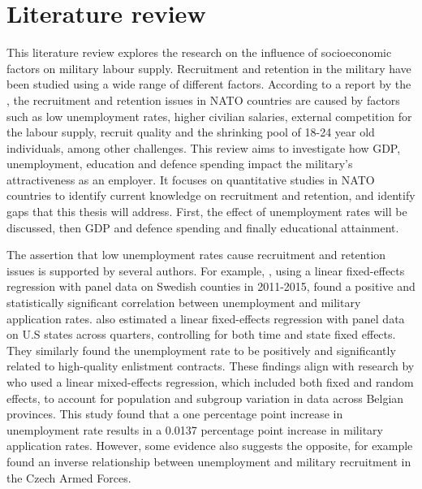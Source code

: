 \chapter{Literature review}

This literature review explores the research on the influence of socioeconomic factors on military labour supply. 
Recruitment and retention in the military have been studied using a wide range of different factors. 
According to a report by the \textcite{nato_research_and_technology_organization_recruiting_2007}, the recruitment and retention issues in NATO countries are caused by factors such as low unemployment rates, higher civilian salaries, external competition for the labour supply, recruit quality and the shrinking pool of 18-24 year old individuals, among other challenges. 
This review aims to investigate how GDP, unemployment, education and defence spending impact the military's attractiveness as an employer. 
It focuses on quantitative studies in NATO countries to identify current knowledge on recruitment and retention, and identify gaps that this thesis will address. 
First, the effect of unemployment rates will be discussed, then GDP and defence spending and finally educational attainment.

The assertion that low unemployment rates cause recruitment and retention issues is supported by several authors.
For example, \textcite{backstrom_are_2019}, using a linear fixed-effects regression with panel data on Swedish counties in 2011-2015, found a positive and statistically significant correlation between unemployment and military application rates. 
\textcite{asch_cash_2010} also estimated a linear fixed-effects regression with panel data on U.S states across quarters, controlling for both time and state fixed effects.
They similarly found the unemployment rate to be positively and significantly related to high-quality enlistment contracts. 
These findings align with research by \textcite{balcaen_unemployment_2025} who used a linear mixed-effects regression, which included both fixed and random effects, to account for population and subgroup variation in data across Belgian provinces.
This study found that a one percentage point increase in unemployment rate results in a 0.0137 percentage point increase in military application rates.
However, some evidence also suggests the opposite, for example \textcite{holcner_military_2021} found an inverse relationship between unemployment and military recruitment in the Czech Armed Forces.


